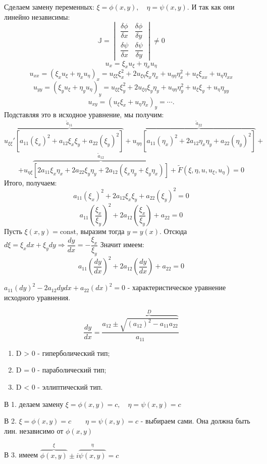 Сделаем замену переменных: $ \xi = \phi (x, y), \quad \eta = \psi (x, y) $. И так как они линейно независимы:
$$ \mathbb{J} = \begin{vmatrix}
        \dfrac{\delta \phi}{\delta x} & \dfrac{\delta \phi}{\delta y} \\
        \dfrac{\delta \psi}{\delta x} & \dfrac{\delta \psi}{\delta y}
    \end{vmatrix} \neq 0 $$
$$ u_x = \xi_x u_\xi + \eta_x u_\eta $$
$$ u_{xx} = (\xi_x u_\xi + \eta_x u_\eta)_x = u_{\xi \xi} \xi^2_x + 2u_{\xi \eta} \xi_x \eta_x + u_{\eta \eta} \eta^2_x + u_\xi \xi_{xx} + u_\eta \eta_{xx} $$
$$ u_{yy} = (\xi_y u_\xi + \eta_y u_\eta)_y = u_{\xi \xi} \xi^2_y + 2u_{\xi \eta} \xi_y \eta_y + u_{\eta \eta} \eta^2_y + u_\xi \xi_{y} + u_\eta \eta_{yy} $$
$$ u_{xy} = (u_\xi \xi_x + u_\eta \eta_x)_y = \cdots. $$
Подставляя это в исходное уравнение, мы получим:
$$ u_{\xi \xi}' \overbrace{[a_{11}(\xi_x)^2 + a_{12} \xi_x \xi_y + a_{22} (\xi_y)^2]}^{\tilde{a}_{11}} + u_{\eta \eta} \overbrace{[a_{11} (\eta_x)^2 + 2 a_{12} \eta_x \eta_y + a_{22} (\eta_y)^2]}^{\tilde{a}_{22}} + $$
$$ + u_{\eta \xi} \overbrace{[2 a_{11} \xi_x \eta_x + 2 a_{22} \xi_y \eta_y + 2a_{12} ( \xi_x \eta_y + \xi_y \eta_x )]}^{\tilde{a}_{12}} + \tilde{F} (\xi, \eta, u, u_\xi, u_\eta) = 0 $$
Итого, получаем:
$$ a_{11} (\xi_x)^2 + 2 a_{12} \xi_x \xi_y + a_{22} (\xi_y)^2 = 0 $$
$$ a_{11} \left(\dfrac{\xi_x}{\xi_y}\right)^2 + 2 a_{12} \left(\dfrac{\xi_x}{\xi_y}\right) + a_{22} = 0 $$
Пусть $ \xi(x, y) = \text{const} $, выразим тогда $ y = y(x) $. Отсюда $ d\xi = \xi_x dx + \xi_y dy \Rightarrow \dfrac{dy}{dx} = -\dfrac{\xi_x}{\xi_y} $
Значит имеем:
$$ a_{11} \left(\dfrac{dy}{dx}\right)^2 + 2a_{12} \left(\dfrac{dy}{dx}\right) + a_{22} = 0 $$
\begin{definition}
    $a_{11} (dy)^2 - 2 a_{12} dy dx + a_{22} (dx)^2 = 0$ - характеристическое уравнение исходного уравнения. 
\end{definition}
$$ \dfrac{dy}{dx} = \dfrac{a_{12} \pm \overbrace{\sqrt{(a_{12})^2 - a_{11} a_{22}}}^{D}}{a_{11}} $$
\begin{enumerate}
    \item D > 0 - гиперболический тип;
    \item D = 0 - параболический тип;
    \item D < 0 - эллиптический тип.
\end{enumerate}
В 1. делаем замену $ \xi = \phi (x, y) = c, \quad \eta = \psi (x, y) = c $ \par
В 2. $\xi = \phi (x, y) = c \quad \quad \eta = \psi (x, y) = c$ - выбираем сами. Она должна быть лин. независимо от $\phi (x, y)$ \par
В 3. имеем $ \overbrace{\phi (x, y)}^{\xi} \pm i \overbrace{\psi (x, y)}^{\eta} = c $